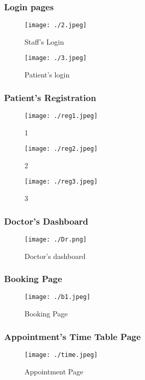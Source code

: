 \documentclass[]{article}
\begin{document}
\subsubsection{Login pages}
\FloatBarrier
\begin{figure}[h]
\centering
\texttt{[image: ./2.jpeg]}
\caption{Staff's Login}
\label{label1}
\end{figure}
\begin{figure}[h]
\centering
\texttt{[image: ./3.jpeg]}
\caption{Patient's login}
\label{label2}
\end{figure}
\FloatBarrier
\bigskip
\bigskip
\subsubsection{Patient's Registration}
\begin{figure}
 \begin{minipage}{.5\textwidth}
  \texttt{[image: ./reg1.jpeg]}
  \caption{1}
 \end{minipage}
 \begin{minipage}{.5\textwidth}
  \texttt{[image: ./reg2.jpeg]}
  \caption{2}
 \end{minipage}
  \begin{minipage}{.5\textwidth}
  \texttt{[image: ./reg3.jpeg]}
  \caption{3}
 \end{minipage}
\end{figure}
\FloatBarrier
\FloatBarrier
\subsubsection{Doctor's Dashboard}
\begin{figure}[h]
\centering
\texttt{[image: ./Dr.png]}
\caption{Doctor's dashboard}
\label{label1}
\end{figure}
\FloatBarrier
\newpage
\FloatBarrier
\subsubsection{Booking Page}
\begin{figure}[h]
\centering
\texttt{[image: ./b1.jpeg]}
\caption{Booking Page}
\label{label1}
\end{figure}
\FloatBarrier
\newpage
\FloatBarrier
\subsubsection{Appointment's Time Table Page}
\begin{figure}[h]
\centering
\texttt{[image: ./time.jpeg]}
\caption{Appointment Page}
\label{label1}
\end{figure}
\FloatBarrier
\end{document}

